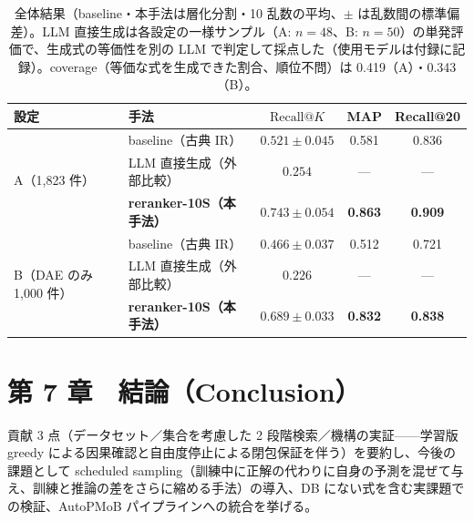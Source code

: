 \documentclass[11pt,a4paper]{ltjsarticle}
\makeatletter
\newcommand{\rk}{\textrm{Recall@}K}
\makeatother
\begin{document}
\begin{table}[h]\centering
\small
\caption{全体結果（baseline・本手法は層化分割・10 乱数の平均、$\pm$ は乱数間の標準偏差）。LLM 直接生成は各設定の一様サンプル（A: $n=48$、B: $n=50$）の単発評価で、生成式の等価性を別の LLM で判定して採点した（使用モデルは付録に記録）。coverage（等価な式を生成できた割合、順位不問）は 0.419（A）・0.343（B）。}
\begin{tabular}{llccc}
\toprule
設定 & 手法 & $\rk$ & MAP & Recall@20 \\
\midrule
\multirow{3}{*}{A（1{,}823 件）}
 & baseline（古典 IR） & $0.521\pm0.045$ & 0.581 & 0.836 \\
 & LLM 直接生成（外部比較） & $0.254$ & --- & --- \\
 & \textbf{reranker-10S（本手法）} & $\mathbf{0.743\pm0.054}$ & \textbf{0.863} & \textbf{0.909} \\
\midrule
\multirow{3}{*}{B（DAE のみ 1{,}000 件）}
 & baseline（古典 IR） & $0.466\pm0.037$ & 0.512 & 0.721 \\
 & LLM 直接生成（外部比較） & $0.226$ & --- & --- \\
 & \textbf{reranker-10S（本手法）} & $\mathbf{0.689\pm0.033}$ & \textbf{0.832} & \textbf{0.838} \\
\bottomrule
\end{tabular}
\end{table}

\section*{第 7 章　結論（Conclusion）}
貢献 3 点（データセット／集合を考慮した 2 段階検索／機構の実証——学習版 greedy による因果確認と自由度停止による閉包保証を伴う）を要約し、今後の課題として scheduled sampling（訓練中に正解の代わりに自身の予測を混ぜて与え、訓練と推論の差をさらに縮める手法）の導入、DB にない式を含む実課題での検証、AutoPMoB パイプラインへの統合を挙げる。
\end{document}
